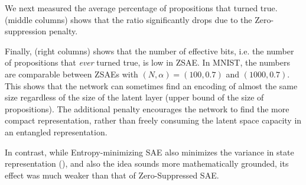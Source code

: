 We next measured the average percentage of propositions that turned true.
 (middle columns) shows that the ratio significantly drops due to the Zero-suppression penalty.

Finally,  (right columns) shows that the number of effective bits,
i.e. the number of propositions that \emph{ever} turned true, is low in ZSAE.
In MNIST, the numbers are comparable between ZSAEs with $(N,\alpha)=(100,0.7)$ and $(1000,0.7)$.
This shows that the network can sometimes find an encoding of almost the same size
regardless of the size of the latent layer (upper bound of the size of
propositions). The additional
penalty encourages the network to find the more compact representation,
rather than freely consuming the latent space capacity in an entangled representation.


In contrast, while Entropy-minimizing SAE also minimizes the variance in state representation
(),
and also the idea sounds more mathematically grounded,
its effect was much weaker than that of Zero-Suppressed SAE.

